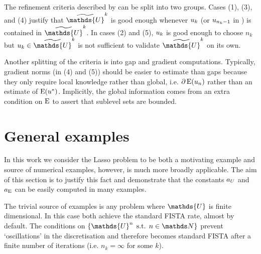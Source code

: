 \documentclass[10pt,a4paper,onecolumn]{article} \usepackage[latin1]{inputenc}
\numberwithin{equation}{section}
\let\F\mathds\let\C\mathcal\newcommand{\R}{\F{R}}\newcommand{\A}{\C{A}}
\newcommand{\op}[1]{\operatorname{#1}}\newcommand{\overtext}[2]{\stackrel{\text{#1}}{#2}}
\DeclareMathOperator{\st}{\;s.t.\;}\DeclareMathOperator{\as}{\;a.s.\;}\renewcommand{\epsilon}{\varepsilon}
\newcommand{\UCmath}[1]{%
	\begingroup
	\ucmathlist\uppercase\expandafter{#1}%
	\endgroup
}
\newcommand{\ucmathlist}{%
	\def\alpha{\mathrm{A}}%
	\def\beta{\mathrm{B}}%
	\let\gamma=\Gamma
	\let\delta=\Delta
	\def\epsilon{\mathrm{E}}%
	\def\varepsilon{\mathrm{E}}%
	\def\zeta{\mathrm{Z}}%
	\def\eta{\mathrm{H}}%
	\let\theta=\Theta
	\let\vartheta=\Theta
	\def\iota{\mathrm{I}}%
	\def\kappa{\mathrm{K}}%
	\let\lambda=\Lambda
	\def\mu{\mathrm{M}}%
	\def\nu{\mathrm{N}}%
	\let\xi=\Xi
	\let\pi=\Pi
	\let\varpi=\Pi
	\def\rho{\mathrm{P}}%
	\def\varrho{\mathrm{P}}%
	\let\sigma=\Sigma
	\def\tau{\mathrm{T}}%
	\let\upsilon=\Upsilon
	\let\phi=\Phi
	\let\varphi=\Phi
	\def\chi{\mathrm{X}}%
	\let\psi=\Psi
	\let\omega=\Omega
}
\newcommand{\caps}[1]{\UCmath{#1}}
\newcommand*{\Func}[1]{%
	\IfEqCase{#1}{%
		{0}{\op{E}}%
		{1}{\op{F}}%
		{2}{\op{G}}%
		{3}{\op{H}}%
	}[\op{F}#1]%
}
\newcommand*{\varf}[1]{%
	\IfEqCase{#1}{%
		{0}{u}%
		{1}{v}%
		{2}{w}%
	}[u#1]%
}
\newcommand*{\spcf}[1]{%
	\IfEqCase{#1}{%
		{0}{\F{U}}%
		{1}{\F{V}}%
		{2}{\F{W}}%
	}[\F{U}#1]%
}
\newcommand*{\vars}[1]{%
	\IfEqCase{#1}{%
		{0}{\alpha}%
		{1}{\beta}%
		{2}{\gamma}%
		{3}{a}%
		{4}{b}%
		{5}{c}%
	}[k#1]%
}
\newcommand*{\Varf}[1]{\caps{\varf{#1}}}
\begin{document}
The refinement criteria described by  can be split into two groups. Cases (1), (3), and (4) justify that $\tilde{\spcf0}^k$ is good enough whenever $\varf0_k$ (or $\varf0_{n_k-1}$ in ) is contained in $\tilde{\spcf0}^k$. In cases (2) and (5), $\varf0_k$ is good enough to choose $n_k$ but $\varf0_k\in\tilde{\spcf0}^k$ is not sufficient to validate $\tilde{\spcf0}^k$ on its own.

Another splitting of the criteria is into gap and gradient computations. Typically, gradient norms (in (4) and (5)) should be easier to estimate than gaps because they only require local knowledge rather than global, i.e. $\partial\Func0(\varf0_n)$ rather than an estimate of $\Func0(\varf0^*)$. Implicitly, the global information comes from an extra condition on $\Func0$ to assert that sublevel sets are bounded.

\section{General examples}\label{sec:ca: general examples}
In this work we consider the Lasso problem to be both a motivating example and source of numerical examples, however,  is much more broadly applicable. The aim of this section is to justify this fact and demonstrate that the constants $\vars3_{\Varf0}$ and $\vars3_{\Func0}$ can be easily computed in many examples. 

The trivial source of examples is any problem where $\spcf0$ is finite dimensional. In this case  both achieve the standard FISTA rate, almost by default. The conditions on $\{\spcf0^n\st n\in\F N\}$ prevent `oscillations' in the discretisation and therefore  becomes standard FISTA after a finite number of iterations (i.e. $n_k=\infty$ for some $k$).
\end{document}
